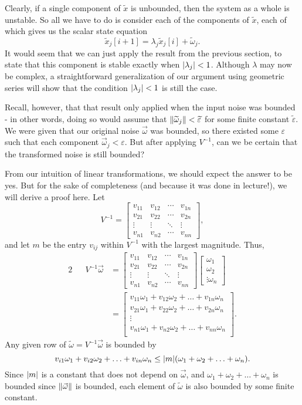 \documentclass[letterpaper]{article}
\theoremstyle{remark}
\newcommand{\eps}{{\varepsilon}}    %
\renewcommand{\tilde}[1]{\widetilde{#1}}
\newcommand{\mat}[1]{\ensuremath{\begin{bmatrix}#1\end{bmatrix}}}
\newcommand{\eqn}[1]{\begin{alignat*}{2}#1\end{alignat*}}
\begin{document}
Clearly, if a single component of $\tilde{x}$ is unbounded, then the system as a whole is unstable. So all we have to do is consider each of the components of $\tilde{x}$, each of which gives us the scalar state equation
\[
    \tilde{x}_j[i + 1] = \lambda_j \tilde{x}_j[i] + \tilde{\omega}_j.
\]
It would seem that we can just apply the result from the previous section, to state that this component is stable exactly when $\abs{\lambda_j} < 1$. Although $\lambda$ may now be complex, a straightforward generalization of our argument using geometric series will show that the condition $\abs{\lambda_j} < 1$ is still the case.

Recall, however, that that result only applied when the input noise was bounded - in other words, doing so would assume that $\norm{\tilde{\omega}_j} < \tilde{\eps}$ for some finite constant $\tilde{\eps}$. We were given that our original noise $\vec{\omega}$ was bounded, so there existed some $\eps$ such that each component $\vec{\omega}_j < \eps$. But after applying $V^{-1}$, can we be certain that the transformed noise is still bounded? 

From our intuition of linear transformations, we should expect the answer to be yes. But for the sake of completeness (and because it was done in lecture!), we will derive a proof here. Let
\[
    V^{-1} = \mat{
    v_{11} & v_{12} & \cdots & v_{1n} \\
    v_{21} & v_{22} & \cdots & v_{2n} \\
    \vdots & \vdots & \ddots & \vdots \\
    v_{n1} & v_{n2} & \cdots & v_{nn}
    },
\]
and let $m$ be the entry $v_{ij}$ within $V^{-1}$ with the largest magnitude. Thus,
\eqn{
    && V^{-1}\vec{\omega} &= \mat{
    v_{11} & v_{12} & \cdots & v_{1n} \\
    v_{21} & v_{22} & \cdots & v_{2n} \\
    \vdots & \vdots & \ddots & \vdots \\
    v_{n1} & v_{n2} & \cdots & v_{nn}
    } \mat{\omega_1 \\ \omega_2 \\ \vdots \omega_n} \\
    &&&= \mat{
    v_{11}\omega_1 + v_{12}\omega_2 + \ldots + v_{1n}\omega_n \\
    v_{21}\omega_1 + v_{22}\omega_2 + \ldots + v_{2n}\omega_n \\
    \vdots \\
    v_{n1}\omega_1 + v_{n2}\omega_2 + \ldots + v_{nn}\omega_n \\
    }.
}
Any given row of $\tilde{\omega} = V^{-1}\vec{\omega}$ is bounded by
\[
    v_{i1}\omega_1 + v_{i2}\omega_2 + \ldots + v_{in}\omega_n \le \abs{m}(\omega_1 + \omega_2 + \ldots + \omega_n).
\]
Since $\abs{m}$ is a constant that does not depend on $\vec{\omega}$, and $\omega_1 + \omega_2 + \ldots + \omega_n$ is bounded since $\norm{\vec{\omega}}$ is bounded, each element of $\tilde{\omega}$ is also bounded by some finite constant.
\end{document}
